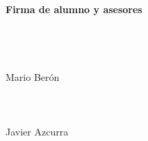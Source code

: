 \documentclass[a4paper,12pt]{article}
\begin{document}
\renewcommand{\refname}{\Large \textbf{Bibliografía}}

\setlength{\bibsep}{1.5pt}%




\nocite{*}%

{\Large \textbf{\\\\Firma de alumno y asesores}}\\\\\\\\


\makebox[2.5in]{\dotfill} \hspace {1.0in}\makebox[2.5in]{\dotfill} \\
\hspace*{1.5cm} Mario Berón  \\\\\\

\vspace{.2in}
\makebox[2.5in]{\dotfill} \hspace {1.0in}\\
\hspace*{1.5cm} Javier Azcurra
\end{document}

